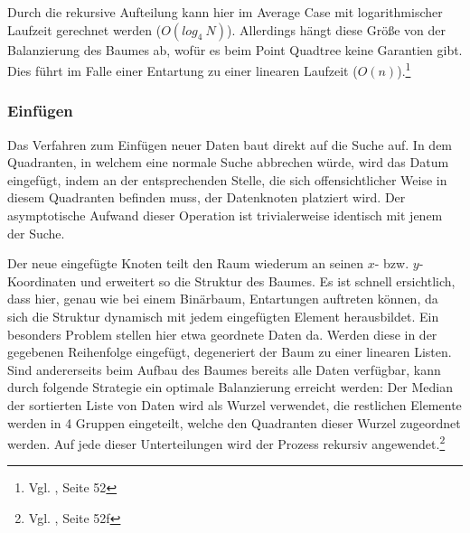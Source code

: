 \documentclass[%
			paper=a4,%
			DIV12,
			draft=false,%
			titlepage
			]{scrartcl}
\newcommand{\zit}[3]{#1 \cite{#2}, #3}
\newcommand{\footzit}[3]{\footnote{\zit{#1}{#2}{#3}}}
\begin{document}
Durch die rekursive Aufteilung kann hier im Average Case mit logarithmischer Laufzeit gerechnet werden ($O(log_4\ N)$).
Allerdings hängt diese Größe von der Balanzierung des Baumes ab, wofür es beim Point Quadtree keine Garantien gibt. Dies führt im Falle einer Entartung zu einer linearen Laufzeit ($O(n)$).\footzit{Vgl.}{Samet90}{Seite 52}


\subsubsection{Einfügen}
\label{sec:pointquadtree:insert}
Das Verfahren zum Einfügen neuer Daten baut direkt auf die Suche auf.
In dem Quadranten, in welchem eine normale Suche abbrechen würde, wird das Datum eingefügt, indem an der entsprechenden Stelle, die sich offensichtlicher Weise in diesem Quadranten befinden muss, der Datenknoten platziert wird.
Der asymptotische Aufwand dieser Operation ist trivialerweise identisch mit jenem der Suche.

Der neue eingefügte Knoten teilt den Raum wiederum an seinen $x$- bzw. $y$-Koordinaten und erweitert so die Struktur des Baumes.  
Es ist schnell ersichtlich, dass hier, genau wie bei einem Binärbaum, Entartungen auftreten können, da sich die Struktur dynamisch mit jedem eingefügten Element herausbildet. 
Ein besonders Problem stellen hier etwa geordnete Daten da. Werden diese in der gegebenen Reihenfolge eingefügt, degeneriert der Baum zu einer linearen Listen. Sind andererseits beim Aufbau des Baumes bereits alle Daten verfügbar, kann durch folgende Strategie ein optimale Balanzierung erreicht werden: Der Median der sortierten Liste von Daten wird als Wurzel verwendet, die restlichen Elemente werden in 4 Gruppen eingeteilt, welche den Quadranten dieser Wurzel zugeordnet werden. Auf jede dieser Unterteilungen wird der Prozess rekursiv angewendet.\footzit{Vgl.}{Samet90}{Seite 52f}
\end{document}
